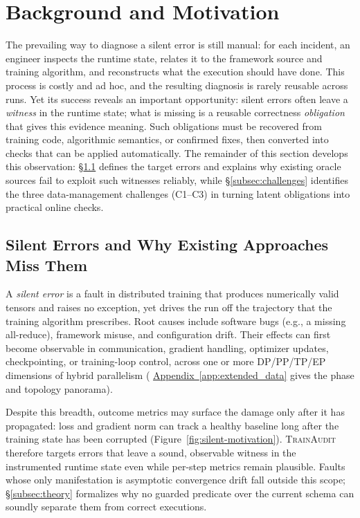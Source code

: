 \documentclass[sigconf,nonacm]{acmart}
\newcommand{\suppappendix}[1]{%
  \href{https://github.com/vivia-an/trainaudit-vldb-artifact/blob/vldb-2027-artifact-v1.0.1/paper/appendix_supplement.pdf}%
  {Appendix~\ref*{#1}}}
\begin{document}
\section{Background and Motivation}
\label{sec:background}

The prevailing way to diagnose a silent error is still manual: for each incident, an engineer inspects the runtime state, relates it to the framework source and training algorithm, and reconstructs what the execution should have done. This process is costly and ad hoc, and the resulting diagnosis is rarely reusable across runs. Yet its success reveals an important opportunity: silent errors often leave a \emph{witness} in the runtime state; what is missing is a reusable correctness \emph{obligation} that gives this evidence meaning. Such obligations must be recovered from training code, algorithmic semantics, or confirmed fixes, then converted into checks that can be applied automatically. The remainder of this section develops this observation: \S\ref{subsec:silent-errors} defines the target errors and explains why existing oracle sources fail to exploit such witnesses reliably, while \S\ref{subsec:challenges} identifies the three data-management challenges (C1--C3) in turning latent obligations into practical online checks.

\subsection{Silent Errors and Why Existing Approaches Miss Them}
\label{subsec:silent-errors}
\label{subsec:limitations}

A \emph{silent error} is a fault in distributed training that produces numerically valid tensors and raises no exception, yet drives the run off the trajectory that the training algorithm prescribes. Root causes include software bugs (e.g., a missing all-reduce), framework misuse, and configuration drift. Their effects can first become observable in communication, gradient handling, optimizer updates, checkpointing, or training-loop control, across one or more DP/PP/TP/EP dimensions of hybrid parallelism (\suppappendix{app:extended_data} gives the phase and topology panorama).

Despite this breadth, outcome metrics may surface the damage only after it has propagated: loss and gradient norm can track a healthy baseline long after the training state has been corrupted (Figure~\ref{fig:silent-motivation}). \textsc{TrainAudit} therefore targets errors that leave a sound, observable witness in the instrumented runtime state even while per-step metrics remain plausible. Faults whose only manifestation is asymptotic convergence drift fall outside this scope; \S\ref{subsec:theory} formalizes why no guarded predicate over the current schema can soundly separate them from correct executions.
\end{document}
